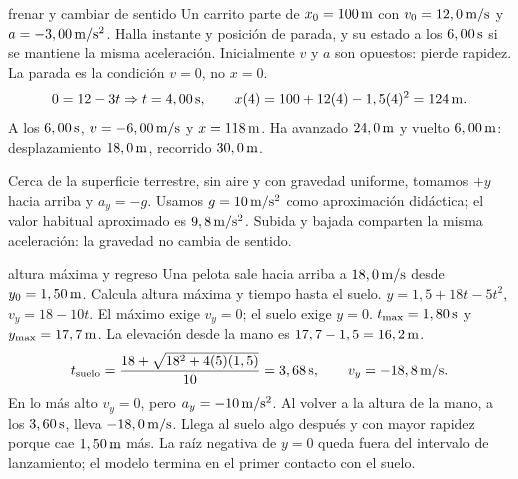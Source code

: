 \documentclass[11pt,a4paper]{article}
\begin{document}
\begin{examplebox}{frenar y cambiar de sentido}
 Un carrito parte de $x_0=100\,\mathrm{m}$ con
$v_0=12,0\,\mathrm{m/s}$ y $a=-3,00\,\mathrm{m/s^2}$. Halla instante y posici\'on de parada,
y su estado a los $6,00\,\mathrm{s}$ si se mantiene la misma aceleraci\'on.
\solutionblock
{} Inicialmente $v$ y $a$ son opuestos: pierde rapidez.
La parada es la condici\'on $v=0$, no $x=0$.
\[
0=12-3t\Rightarrow t=4,00\,\mathrm{s},\qquad
x(4)=100+12(4)-1,5(4)^2=124\,\mathrm{m}.
\]
A los $6,00\,\mathrm{s}$, $v=-6,00\,\mathrm{m/s}$ y $x=118\,\mathrm{m}$.
 Ha avanzado $24,0\,\mathrm{m}$ y vuelto $6,00\,\mathrm{m}$:
desplazamiento $18,0\,\mathrm{m}$, recorrido $30,0\,\mathrm{m}$.
\end{examplebox}

Cerca de la superficie terrestre, sin aire y con gravedad uniforme,
tomamos $+y$ hacia arriba y $a_y=-g$. Usamos $g=10\,\mathrm{m/s^2}$ como aproximaci\'on
did\'actica; el valor habitual aproximado es $9,8\,\mathrm{m/s^2}$.
Subida y bajada comparten la misma aceleraci\'on: la gravedad no cambia de sentido.

\begin{examplebox}{altura m\'axima y regreso}
 Una pelota sale hacia arriba a $18,0\,\mathrm{m/s}$ desde
$y_0=1,50\,\mathrm{m}$. Calcula altura m\'axima y tiempo hasta el suelo.
\solutionblock
{} $y=1,5+18t-5t^2$, $v_y=18-10t$.
El m\'aximo exige $v_y=0$; el suelo exige $y=0$.
 $t_{\max}=1,80\,\mathrm{s}$ y $y_{\max}=17,7\,\mathrm{m}$.
La elevaci\'on desde la mano es $17,7-1,5=16,2\,\mathrm{m}$.
\[
t_{\mathrm{suelo}}=\frac{18+\sqrt{18^2+4(5)(1,5)}}{10}
=3,68\,\mathrm{s},\qquad v_y=-18,8\,\mathrm{m/s}.
\]
 En lo m\'as alto $v_y=0$, pero $a_y=-10\,\mathrm{m/s^2}$.
Al volver a la altura de la mano, a los $3,60\,\mathrm{s}$, lleva $-18,0\,\mathrm{m/s}$.
Llega al suelo algo despu\'es y con mayor rapidez porque cae $1,50\,\mathrm{m}$ m\'as.
La ra\'iz negativa de $y=0$ queda fuera del intervalo de lanzamiento; el modelo
termina en el primer contacto con el suelo.
\end{examplebox}
\end{document}
